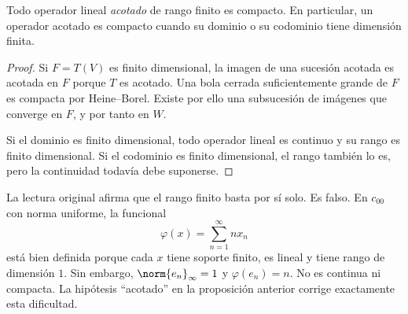 \begin{proposicion}\label{ch23:rango-finito}
Todo operador lineal \emph{acotado} de rango finito es compacto. En particular, un operador acotado es compacto cuando su dominio o su codominio tiene dimensión finita.
\end{proposicion}
\begin{proof}
Si $F=T(V)$ es finito dimensional, la imagen de una sucesión acotada es acotada en $F$ porque $T$ es acotado. Una bola cerrada suficientemente grande de $F$ es compacta por Heine--Borel. Existe por ello una subsucesión de imágenes que converge en $F$, y por tanto en $W$.

Si el dominio es finito dimensional, todo operador lineal es continuo y su rango es finito dimensional. Si el codominio es finito dimensional, el rango también lo es, pero la continuidad todavía debe suponerse.
\end{proof}

\begin{observacion}
La lectura original afirma que el rango finito basta por sí solo. Es falso. En $c_{00}$ con norma uniforme, la funcional
\[
 \varphi(x)=\sum_{n=1}^{\infty}n x_n
\]
está bien definida porque cada $x$ tiene soporte finito, es lineal y tiene rango de dimensión $1$. Sin embargo, $\norm{e_n}_\infty=1$ y $\varphi(e_n)=n$. No es continua ni compacta. La hipótesis ``acotado'' en la proposición anterior corrige exactamente esta dificultad.
\end{observacion}

